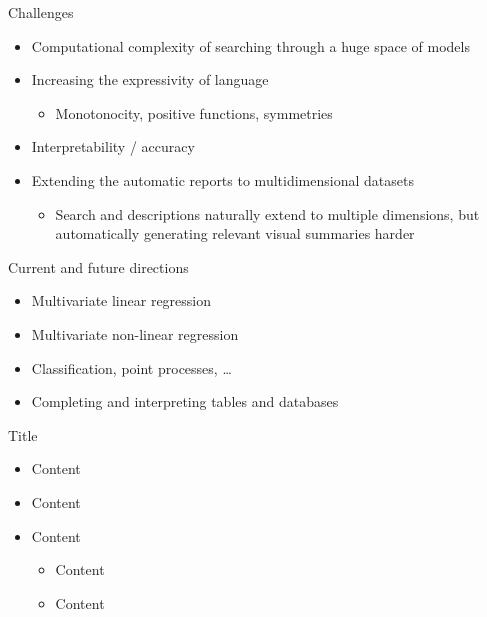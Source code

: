 \begin{frame}{Challenges}
  \begin{itemize}
    \item Computational complexity of searching through a huge space of models
    \vspace{\baselineskip}
    \item Increasing the expressivity of language
    \begin{itemize}
      \item \eg Monotonocity, positive functions, symmetries
    \end{itemize}
    \vspace{\baselineskip}
    \item Interpretability / accuracy
    \vspace{\baselineskip}
    \item Extending the automatic reports to multidimensional datasets
    \begin{itemize}
      \item Search and descriptions naturally extend to multiple dimensions, but automatically generating relevant visual summaries harder 
    \end{itemize}
  \end{itemize}
\end{frame}

\begin{frame}{Current and future directions}
  \begin{itemize}
    \item Multivariate linear regression
    \vspace{\baselineskip}
    \item Multivariate non-linear regression
    \vspace{\baselineskip}
    \item Classification, point processes, \dots
    \vspace{\baselineskip}
    \item Completing and interpreting tables and databases
    \vspace{\baselineskip}
  \end{itemize}
\end{frame}



\begin{frame}{Title}
  \begin{itemize}
    \item Content
    \vspace{\baselineskip}
    \item Content
    \vspace{\baselineskip}
    \item Content
    \begin{itemize}
       \item Content
       \item Content
     \end{itemize}
  \end{itemize}
\end{frame}